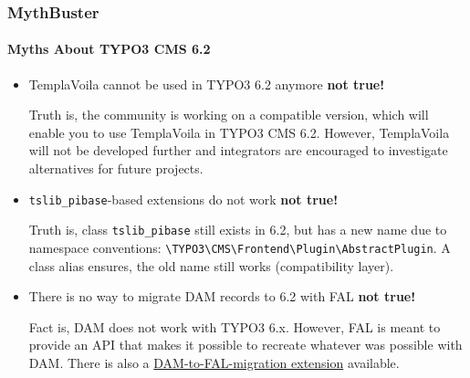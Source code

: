 \begin{frame}[fragile]
	\frametitle{MythBuster}
	\framesubtitle{Myths About TYPO3 CMS 6.2}

	\begin{itemize}
		\item TemplaVoila cannot be used in TYPO3 6.2 anymore
			\tabto{9cm}\color{red}\textbf{\textrightarrow not true!}\color{black}

			\smaller
				Truth is, the community is working on a compatible version, which will enable you to use TemplaVoila in TYPO3 CMS 6.2. However, TemplaVoila will not be developed further and integrators are encouraged to investigate alternatives for future projects.
			\normalsize

		\item \texttt{tslib\_pibase}-based extensions do not work
			\tabto{9cm}\color{red}\textbf{\textrightarrow not true!}\color{black}

			\smaller
				Truth is, class \texttt{tslib\_pibase} still exists in 6.2, but has a new name due to namespace conventions: \texttt{\textbackslash TYPO3\textbackslash CMS\textbackslash Frontend\textbackslash Plugin\textbackslash AbstractPlugin}.\newline
				A class alias ensures, the old name still works (compatibility layer).
			\normalsize

		\item There is no way to migrate DAM records to 6.2 with FAL
			\tabto{9cm}\color{red}\textbf{\textrightarrow not true!}\color{black}

			\smaller
				Fact is, DAM does not work with TYPO3 6.x. However, FAL is meant to provide an API that makes it possible to recreate whatever was possible with DAM. There is also a \href{https://github.com/fnagel/t3ext-dam_falmigration}{DAM-to-FAL-migration extension} available.
			\normalsize

	\end{itemize}

\end{frame}


